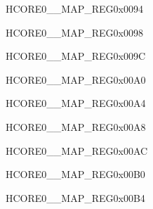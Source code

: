 \begin{register}{H}{CORE0\_\_MAP\_REG}{0x0094}\label{regdesc:CORE0ADCINTMAPREG}
\end{register}\vspace{-3em}


\begin{register}{H}{CORE0\_\_MAP\_REG}{0x0098}\label{regdesc:CORE0PWM0INTMAPREG}
\end{register}\vspace{-3em}


\begin{register}{H}{CORE0\_\_MAP\_REG}{0x009C}\label{regdesc:CORE0PWM1INTMAPREG}
\end{register}\vspace{-3em}


\begin{register}{H}{CORE0\_\_MAP\_REG}{0x00A0}\label{regdesc:CORE0TWAI0INTMAPREG}
\end{register}\vspace{-3em}


\begin{register}{H}{CORE0\_\_MAP\_REG}{0x00A4}\label{regdesc:CORE0TWAI1INTMAPREG}
\end{register}\vspace{-3em}


\begin{register}{H}{CORE0\_\_MAP\_REG}{0x00A8}\label{regdesc:CORE0TWAI2INTMAPREG}
\end{register}\vspace{-3em}


\begin{register}{H}{CORE0\_\_MAP\_REG}{0x00AC}\label{regdesc:CORE0RMTINTMAPREG}
\end{register}\vspace{-3em}


\begin{register}{H}{CORE0\_\_MAP\_REG}{0x00B0}\label{regdesc:CORE0I2C0INTMAPREG}
\end{register}\vspace{-3em}


\begin{register}{H}{CORE0\_\_MAP\_REG}{0x00B4}\label{regdesc:CORE0I2C1INTMAPREG}
\end{register}\vspace{-3em}


